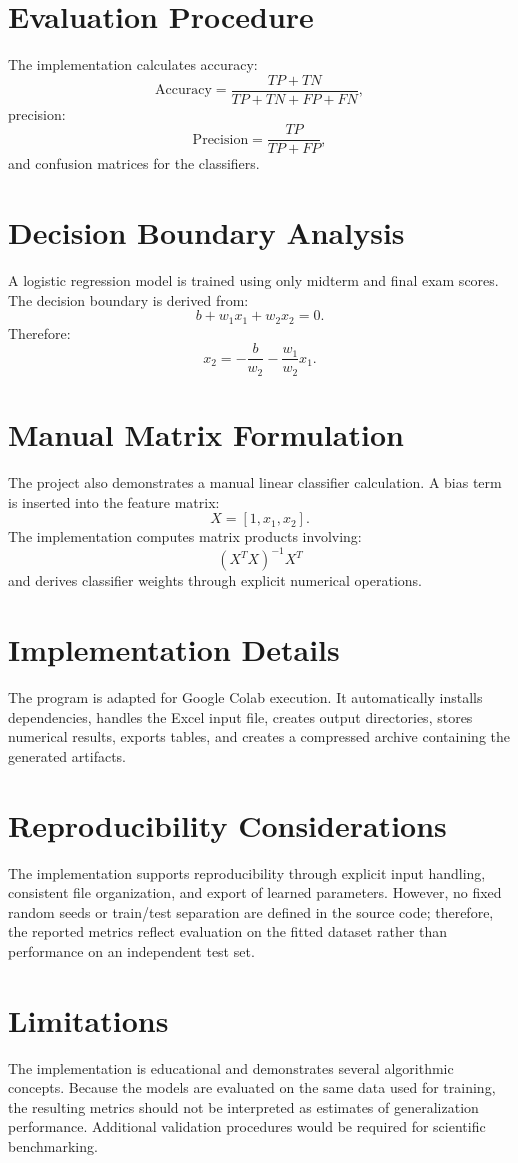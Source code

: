 \documentclass[11pt]{article}
\begin{document}
\section{Evaluation Procedure}
The implementation calculates accuracy:
\[
\mathrm{Accuracy}=\frac{TP+TN}{TP+TN+FP+FN},
\]
precision:
\[
\mathrm{Precision}=\frac{TP}{TP+FP},
\]
and confusion matrices for the classifiers.

\section{Decision Boundary Analysis}
A logistic regression model is trained using only midterm and final exam scores. The
decision boundary is derived from:
\[
b+w_1x_1+w_2x_2=0.
\]
Therefore:
\[
x_2=-\frac{b}{w_2}-\frac{w_1}{w_2}x_1 .
\]

\section{Manual Matrix Formulation}
The project also demonstrates a manual linear classifier calculation. A bias term is
inserted into the feature matrix:
\[
X=[1,x_1,x_2].
\]
The implementation computes matrix products involving:
\[
(X^TX)^{-1}X^T
\]
and derives classifier weights through explicit numerical operations.

\section{Implementation Details}
The program is adapted for Google Colab execution. It automatically installs dependencies,
handles the Excel input file, creates output directories, stores numerical results, exports
tables, and creates a compressed archive containing the generated artifacts.

\section{Reproducibility Considerations}
The implementation supports reproducibility through explicit input handling, consistent
file organization, and export of learned parameters. However, no fixed random seeds or
train/test separation are defined in the source code; therefore, the reported metrics
reflect evaluation on the fitted dataset rather than performance on an independent test set.

\section{Limitations}
The implementation is educational and demonstrates several algorithmic concepts. Because
the models are evaluated on the same data used for training, the resulting metrics should
not be interpreted as estimates of generalization performance. Additional validation
procedures would be required for scientific benchmarking.
\end{document}
